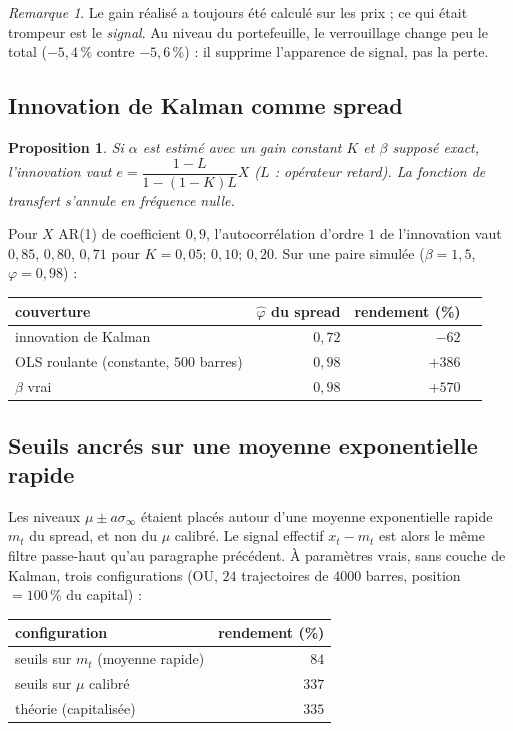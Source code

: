 \documentclass[11pt,a4paper]{article}
\newtheorem{proposition}{Proposition}
\theoremstyle{remark}
\newtheorem{remarque}{Remarque}
\newcommand{\sinf}{\sigma_\infty}
\begin{document}
\begin{remarque}
Le gain réalisé a toujours été calculé sur les prix ; ce qui était trompeur est le \emph{signal}. Au niveau du portefeuille, le verrouillage change peu le total ($-5{,}4\,\%$ contre $-5{,}6\,\%$) : il supprime l'apparence de signal, pas la perte.
\end{remarque}

\subsection{Innovation de Kalman comme spread}

\begin{proposition}
Si $\alpha$ est estimé avec un gain constant $K$ et $\beta$ supposé exact, l'innovation vaut $e=\dfrac{1-L}{1-(1-K)L}X$ ($L$ : opérateur retard). La fonction de transfert s'annule en fréquence nulle.
\end{proposition}

Pour $X$ AR(1) de coefficient $0{,}9$, l'autocorrélation d'ordre $1$ de l'innovation vaut $0{,}85$, $0{,}80$, $0{,}71$ pour $K=0{,}05;\,0{,}10;\,0{,}20$. Sur une paire simulée ($\beta=1{,}5$, $\varphi=0{,}98$) :

\begin{center}
\small
\begin{tabular}{lrrr}
\toprule
couverture & $\hat\varphi$ du spread & rendement (\%) & \\
\midrule
innovation de Kalman & $0{,}72$ & $-62$ & \\
OLS roulante (constante, $500$ barres) & $0{,}98$ & $+386$ & \\
$\beta$ vrai & $0{,}98$ & $+570$ & \\
\bottomrule
\end{tabular}
\end{center}

\subsection{Seuils ancrés sur une moyenne exponentielle rapide}

Les niveaux $\mu\pm a\sinf$ étaient placés autour d'une moyenne exponentielle rapide $m_t$ du spread, et non du $\mu$ calibré. Le signal effectif $x_t-m_t$ est alors le même filtre passe-haut qu'au paragraphe précédent.
À paramètres vrais, sans couche de Kalman, trois configurations (OU, $24$ trajectoires de $4000$ barres, position $=100\,\%$ du capital) :

\begin{center}
\small
\begin{tabular}{lr}
\toprule
configuration & rendement (\%)\\
\midrule
seuils sur $m_t$ (moyenne rapide) & $84$\\
seuils sur $\mu$ calibré & $337$\\
théorie (capitalisée) & $335$\\
\bottomrule
\end{tabular}
\end{center}
\end{document}
